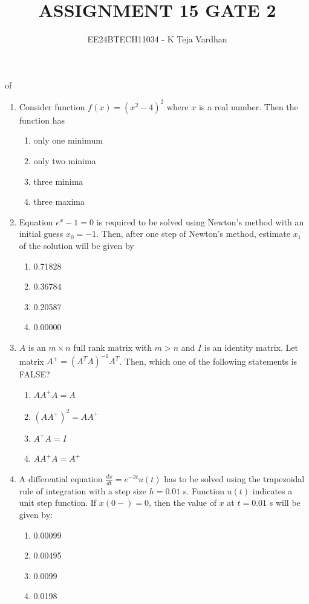 \documentclass{article}
\newcommand{\brak}[1]{\left( #1 \right)}
\newcommand{\gt}{>}
\begin{document}

\title{ASSIGNMENT 15 GATE 2}of
\author{EE24BTECH11034 - K Teja Vardhan}
{\let\newpage\relax\maketitle}




    \begin{enumerate}
    \item Consider function $f\brak{x} = \brak{x^2 - 4}^2$ where $x$ is a real number. Then the function has 
        \begin{enumerate}
            \item only one minimum
            \item only two minima
            \item three minima
            \item three maxima
        \end{enumerate}

    \item Equation $e^x - 1 = 0$ is required to be solved using Newton's method with an initial guess $x_0 = -1$. Then, after one step of Newton's method, estimate $x_1$ of the solution will be given by  

        \begin{enumerate}
            \item 0.71828
            \item 0.36784
            \item 0.20587
            \item 0.00000
        \end{enumerate}

    \item $A$ is an $m \times n$ full rank matrix with $m \gt n$ and $I$ is an identity matrix. Let matrix $A^+ = \brak{A^T A}^{-1} A^T$. Then, which one of the following statements is FALSE?
        \begin{enumerate}
            \item $AA^+A = A$
            \item $\brak{AA^+}^2 = AA^+$
            \item $A^+A = I$
            \item $AA^+A = A^+$
        \end{enumerate}

    \item A differential equation $\frac{dx}{dt} = e^{-2t}u\brak{t}$ has to be solved using the trapezoidal rule of integration with a step size $h = 0.01$ s. Function $u\brak{t}$ indicates a unit step function. If $x\brak{0-} = 0$, then the value of $x$ at $t = 0.01$ s will be given by:
        \begin{enumerate}
            \item 0.00099
            \item 0.00495
            \item 0.0099
            \item 0.0198
        \end{enumerate}


\end{enumerate}
\end{document}
